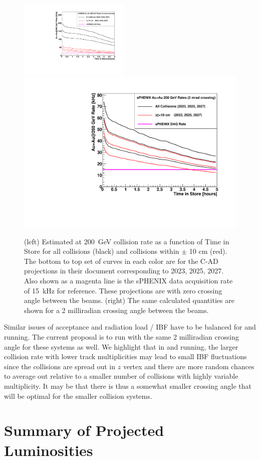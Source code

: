 \begin{figure}
\centering
\includegraphics[width=0.47\textwidth]{figs/figure_auauratestore_0mrad.pdf}
\includegraphics[width=0.47\linewidth]{figs/figure_auauratestore_2mrad.pdf}
\caption{(left) Estimated \auau at 200~GeV collision rate as a function of Time in Store for all collisions (black) and collisions within $\pm$ 10 cm (red).   The bottom to top set of curves in each color are for the C-AD projections in their document corresponding to 2023, 2025, 2027.
Also shown as a magenta line is the sPHENIX data acquisition rate of 15~kHz for reference.
These projections are with zero crossing angle between the beams. 
(right)
The same calculated quantities are shown for a 2 milliradian crossing angle between the beams.
\label{fig:auaulumcurves2}}
\end{figure}

Similar issues of acceptance and radiation load / IBF have to be balanced for \pp and \pau running.   The current proposal is to run with the same 2 milliradian crossing angle for these systems as well.    We highlight that in \pp and \pau running, the larger collision rate with lower track multiplicities may lead to small IBF fluctuations since the collisions are spread out in $z$ vertex and there are more random chances to average out relative to a smaller number of \auau collisions with highly variable multiplicity.     It may be that there is thus a somewhat smaller crossing angle that will be optimal for the smaller collision systems.    

\section{Summary of Projected Luminosities} 

